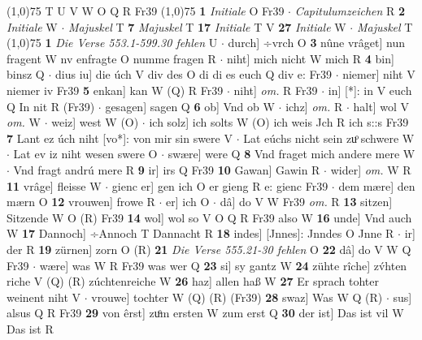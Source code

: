 \documentclass[8pt,a4paper,notitlepage]{article}
\begin{document}
\begin{table}[ht]
\begin{minipage}[t]{0.5\linewidth}
\begin{tabular}{rl}
\end{tabular}
\scriptsize
\line(1,0){75} \newline
T U V W O Q R Fr39 \newline
\line(1,0){75} \newline
\textbf{1} \textit{Initiale} O Fr39   $\cdot$ \textit{Capitulumzeichen} R  \textbf{2} \textit{Initiale} W   $\cdot$ \textit{Majuskel} T  \textbf{7} \textit{Majuskel} T  \textbf{17} \textit{Initiale} T V  \textbf{27} \textit{Initiale} W   $\cdot$ \textit{Majuskel} T  \newline
\line(1,0){75} \newline
\textbf{1} \textit{Die Verse 553.1-599.30 fehlen} U   $\cdot$ durch] ÷vrch O \textbf{3} nûne vrâget] nun fragent W nv enfragte O numme fragen R  $\cdot$ niht] mich nicht W mich R \textbf{4} bin] binsz Q  $\cdot$ dius iu] die úch V div des O di di es euch Q div e: Fr39  $\cdot$ niemer] niht V niemer iv Fr39 \textbf{5} enkan] kan W (Q) R Fr39  $\cdot$ niht] \textit{om.} R Fr39  $\cdot$ in] [*]: in V euch Q In nit R (Fr39)  $\cdot$ gesagen] sagen Q \textbf{6} ob] Vnd ob W  $\cdot$ ichz] \textit{om.} R  $\cdot$ halt] wol V \textit{om.} W  $\cdot$ weiz] west W (O)  $\cdot$ ich solz] ich solts W (O) ich weis Jch R ich s::s Fr39 \textbf{7} Lant ez úch niht [vo*]: von mir sin swere V  $\cdot$ Lat eúchs nicht sein zuͦ schwere W  $\cdot$ Lat ev iz niht wesen swere O  $\cdot$ swære] were Q \textbf{8} Vnd fraget mich andere mere W  $\cdot$ Vnd fragt andrú mere R \textbf{9} ir] irs Q Fr39 \textbf{10} Gawan] Gawin R  $\cdot$ wider] \textit{om.} W R \textbf{11} vrâge] fleisse W  $\cdot$ gienc er] gen ich O er gieng R e: gienc Fr39  $\cdot$ dem mære] den mærn O \textbf{12} vrouwen] frowe R  $\cdot$ er] ich O  $\cdot$ dâ] do V W Fr39 \textit{om.} R \textbf{13} sitzen] Sitzende W O (R) Fr39 \textbf{14} wol] wol so V O Q R Fr39 also W \textbf{16} unde] Vnd auch W \textbf{17} Dannoch] ÷Annoch T Dannacht R \textbf{18} indes] [Jnnes]: Jnndes O Jnne R  $\cdot$ ir] der R \textbf{19} zürnen] zorn O (R) \textbf{21} \textit{Die Verse 555.21-30 fehlen} O  \textbf{22} dâ] do V W Q Fr39  $\cdot$ wære] was W R Fr39 was wer Q \textbf{23} si] sy gantz W \textbf{24} zühte rîche] zv́hten riche V (Q) (R) zúchtenreiche W \textbf{26} haz] allen haß W \textbf{27} Er sprach tohter weinent niht V  $\cdot$ vrouwe] tochter W (Q) (R) (Fr39) \textbf{28} swaz] Was W Q (R)  $\cdot$ sus] alsus Q R Fr39 \textbf{29} von êrst] zuͦm ersten W zum erst Q \textbf{30} der ist] Das ist vil W Das ist R \newline
\end{minipage}
\end{table}
\end{document}
